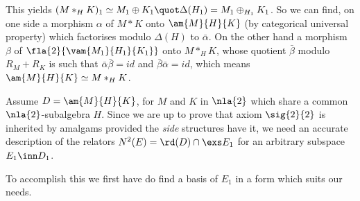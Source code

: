 This yields
$(M\ast_{H} K)_{1}\simeq M_{1}\oplus K_{1}\quot\Delta(H_{1})=M_{1}\oplus_{H_{1}} K_{1}$.
So we can find, on one side a morphism $\alpha$ of $M\ast K$ onto $\am{M}{H}{K}$ (by categorical universal property)
which factorises modulo $\Delta(H)$ to $\bar\alpha$. On the other hand
a morphism $\beta$ of $\fla{2}{\vam{M_{1}}{H_{1}}{K_{1}}}$ onto $M\ast_{H} K$, whose quotient $\bar\beta$ modulo $R_{M}+R_{K}$ is such that $\bar\alpha \bar\beta=id$
and $\bar\beta \bar\alpha=id$, which means $\am{M}{H}{K}\simeq M\ast_{H} K$.
\cbend


\bigskip
Assume $D=\am{M}{H}{K}$, for $M$ and $K$ in $\nla{2}$ which share a common $\nla{2}$-subalgebra $H$.
Since we are up to prove that axiom $\sig{2}{2}$ is inherited by amalgams provided
the {\sl side} structures have it, we need an accurate description of the relators $N^{2}(E)=\rd(D)\cap\exs E_{1}$
for an arbitrary subspace $E_{1}\inn D_{1}$.

To accomplish this we first have do find a basis of $E_{1}$ in a form which suits our needs.

